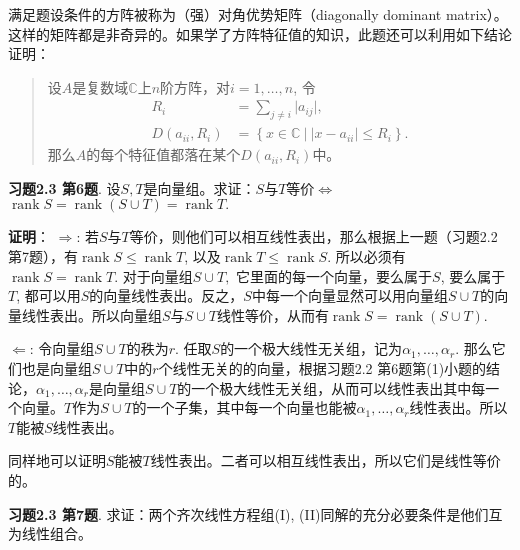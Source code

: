 满足题设条件的方阵被称为（强）对角优势矩阵（diagonally dominant matrix）。这样的矩阵都是非奇异的。如果学了方阵{\color{red}特征值}的知识，此题还可以利用如下结论证明：

\begin{quote}
设$A$是复数域$\mathbb{C}$上$n$阶方阵，对$i = 1, \ldots, n$, 令
\begin{align*}
R_{i} & = \sum_{j\neq {i}}\lvert a_{ij} \rvert, \\
D(a_{ii}, R_{i}) & = \left\{ x \in \mathbb{C} \ |\ \lvert x - a_{ii} \rvert \leqslant R_{i} \right\}.
\end{align*}
那么$A$的每个{\color{red}特征值}都落在某个$D(a_{ii}, R_{i})$中。
\end{quote}

\newpageorvspace

{\bf 习题2.3 第6题}. 设$S, T$是向量组。求证：$S$与$T$等价$\Longleftrightarrow$ $\operatorname{rank} S = \operatorname{rank} (S\cup T) = \operatorname{rank} T.$

\newpageorvspace

{\bf 证明}： $\Longrightarrow$: 若$S$与$T$等价，则他们可以相互线性表出，那么根据上一题（习题2.2 第7题），有$\operatorname{rank} S \leqslant \operatorname{rank} T$, 以及$\operatorname{rank} T \leqslant \operatorname{rank} S$. 所以必须有$\operatorname{rank} S = \operatorname{rank} T.$ 对于向量组$S\cup T,$ 它里面的每一个向量，要么属于$S$, 要么属于$T$, 都可以用$S$的向量线性表出。反之，$S$中每一个向量显然可以用向量组$S\cup T$的向量线性表出。所以向量组$S$与$S\cup T$线性等价，从而有$\operatorname{rank} S = \operatorname{rank} (S\cup T).$

$\Longleftarrow$: 令向量组$S\cup T$的秩为$r$. 任取$S$的一个极大线性无关组，记为$\alpha_1, \ldots, \alpha_r$. 那么它们也是向量组$S\cup T$中的$r$个线性无关的的向量，根据习题2.2 第6题第(1)小题的结论，$\alpha_1, \ldots, \alpha_r$是向量组$S\cup T$的一个极大线性无关组，从而可以线性表出其中每一个向量。$T$作为$S\cup T$的一个子集，其中每一个向量也能被$\alpha_1, \ldots, \alpha_r$线性表出。所以$T$能被$S$线性表出。

同样地可以证明$S$能被$T$线性表出。二者可以相互线性表出，所以它们是线性等价的。

\newpageorvspace

{\bf 习题2.3 第7题}. 求证：两个齐次线性方程组(I), (II)同解的充分必要条件是他们互为线性组合。

\newpageorvspace

